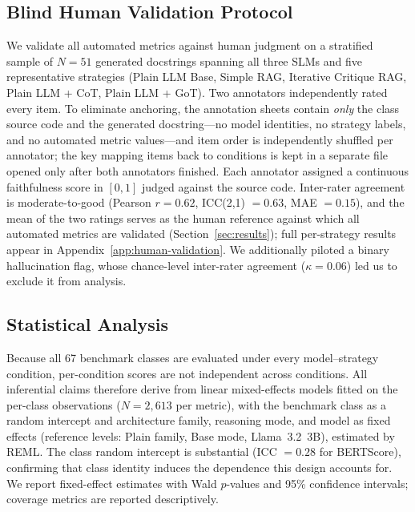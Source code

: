\documentclass[pdflatex,sn-mathphys-ay]{sn-jnl}%
\theoremstyle{thmstyleone}%
\theoremstyle{thmstyletwo}%
\theoremstyle{thmstylethree}%
\begin{document}
{\subsection{Blind Human Validation Protocol}
\label{sec:human-validation}
We validate all automated metrics against human judgment on a stratified sample of $N{=}51$ generated docstrings spanning all three SLMs and five representative strategies (Plain LLM Base, Simple RAG, Iterative Critique RAG, Plain LLM + CoT, Plain LLM + GoT). Two annotators independently rated every item. To eliminate anchoring, the annotation sheets contain \emph{only} the class source code and the generated docstring---no model identities, no strategy labels, and no automated metric values---and item order is independently shuffled per annotator; the key mapping items back to conditions is kept in a separate file opened only after both annotators finished. Each annotator assigned a continuous faithfulness score in $[0,1]$ judged against the source code. Inter-rater agreement is moderate-to-good (Pearson $r=0.62$, ICC(2,1) $=0.63$, MAE $=0.15$), and the mean of the two ratings serves as the human reference against which all automated metrics are validated (Section~\ref{sec:results}); full per-strategy results appear in Appendix~\ref{app:human-validation}. We additionally piloted a binary hallucination flag, whose chance-level inter-rater agreement ($\kappa=0.06$) led us to exclude it from analysis.

\subsection{Statistical Analysis}
\label{sec:stats-design}
Because all 67 benchmark classes are evaluated under every model--strategy condition, per-condition scores are not independent across conditions. All inferential claims therefore derive from linear mixed-effects models fitted on the per-class observations ($N{=}2{,}613$ per metric), with the benchmark class as a random intercept and architecture family, reasoning mode, and model as fixed effects (reference levels: Plain family, Base mode, Llama~3.2~3B), estimated by REML. The class random intercept is substantial (ICC $=0.28$ for BERTScore), confirming that class identity induces the dependence this design accounts for. We report fixed-effect estimates with Wald $p$-values and 95\% confidence intervals; coverage metrics are reported descriptively.

}
\end{document}

